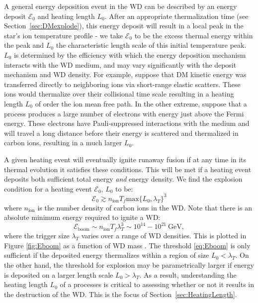 \documentclass[twocolumn,showpacs,preprintnumbers,amsmath,amssymb,prd]{revtex4}
\newcommand{\GeV}{\text{GeV}}
\begin{document}
A general energy deposition event in the WD can be described by an energy deposit $\mathcal{E}_0$ and heating length $L_0$.  After an appropriate thermalization time (see Section~\ref{sec:DMexplode}), this energy deposit will result in a local peak in the star's ion temperature profile - we take $\mathcal{E}_0$ to be the excess thermal energy within the peak and $L_0$ the characteristic length scale of this initial temperature peak.  $L_0$ is determined by the efficiency with which the energy deposition mechanism interacts with the WD medium, and may vary significantly with the deposit mechanism and WD density.  For example, suppose that DM kinetic energy was transferred directly to neighboring ions via short-range elastic scatters. These ions would thermalize over their collisional time scale resulting in a heating length $L_0$ of order the ion mean free path. In the other extreme, suppose that a process produces a large number of electrons with energy just above the Fermi energy.  These electrons have Pauli-suppressed interactions with the medium and will travel a long distance before their energy is scattered and thermalized in carbon ions, resulting in a much larger $L_0$.

A given heating event will eventually ignite runaway fusion if at any time in its thermal evolution it satisfies these conditions.  This will be met if a heating event deposits both sufficient total energy \emph{and} energy density.  We find the explosion condition for a heating event $\mathcal{E}_0$, $L_0$ to be:
\begin{equation}
\label{eq:boom}
  \mathcal{E}_0 \gtrsim n_\text{ion} T_f \text{max}\{L_0, \lambda_T\}^3
\end{equation}
where $n_\text{ion}$ is the number density of carbon ions in the WD. Note that there is an absolute minimum energy required to ignite a WD:
\begin{equation}
\label{eq:Eboom}
\mathcal{E}_{\text{boom}} \sim n_\text{ion} T_f \lambda_T^3 \sim 10^{14} - 10^{21} ~\GeV,
\end{equation}
where the trigger size $\lambda_T$ varies over a range of WD densities.  This is plotted in Figure \ref{fig:Eboom} as a function of WD mass \cite{website}.  The threshold \eqref{eq:Eboom} is only sufficient if the deposited energy thermalizes within a region of size $L_0 < \lambda_T$. On the other hand, the threshold for explosion may be parametrically larger if energy is deposited on a larger length scale $L_0 > \lambda_T$.  As a result, understanding the heating length $L_0$ of a processes is critical to assessing whether or not it results in the destruction of the WD. This is the focus of Section~\ref{sec:HeatingLength}.
\end{document}
